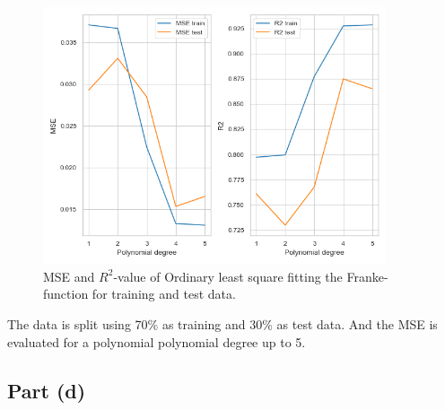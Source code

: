 \begin{figure}
    \centering
    \includegraphics[width=0.9\textwidth]{Figures/1. Franke-function/franke_OLS_mse_r2.png}
    \caption{MSE and $R^2$-value of Ordinary least square fitting the Franke-function for training and test data. }
    \label{fig:MSE-R2}
\end{figure}


The data is split using 70\% as training and 30\% as test data. And the MSE is evaluated for a polynomial polynomial degree up to 5. 





\subsection{Part (d)} \label{section:Exercise 1}

